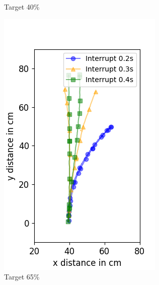 \begin{figure}
\begin{subfigure}[b]{0.32\textwidth}
		\caption{Target 40\%}
		\label{fig:target_40}
	\end{subfigure}
	\begin{subfigure}[b]{0.32\textwidth}
		\includegraphics[width=\textwidth]{pics/figure_65.png}
		\caption{Target 65\%}
		\label{fig:target_65}
	\end{subfigure}
	\begin{subfigure}[b]{0.32\textwidth}

\end{subfigure}
\end{figure}
